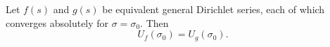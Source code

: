 Let $f(s)$ and $g(s)$ be equivalent general Dirichlet series, each of which converges absolutely for $\sigma = \sigma_0$. Then
$$U_f(\sigma_0) = U_g(\sigma_0).$$
